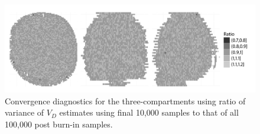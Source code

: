 \begin{figure}
  \linespread{1.1}\selectfont
  \includegraphics[width=\linewidth]{fig_src/PET_Converge}
  \caption[Convergence diagnostics for the random walk algorithm for the
  \protect\pet compartmental model using summary statistics]
  {Convergence diagnostics for the three-compartments \pet using ratio of
    variance of $V_D$ estimates using final 10,000 samples to that of all
    100,000 post burn-in samples.}
  \label{fig:pet diag ratio}
\end{figure}
